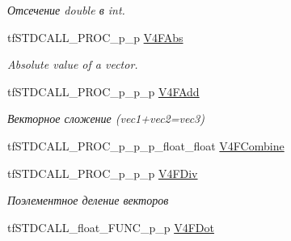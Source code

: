 \begin{DoxyCompactItemize}
\begin{DoxyCompactList}\small\item\em Отсечение double в int. \end{DoxyCompactList}\item 
\hypertarget{structs_functions_vector_c_p_u_a8dc673f10ac0abfe245f7ea4720bdee3}{tf\-S\-T\-D\-C\-A\-L\-L\-\_\-\-P\-R\-O\-C\-\_\-p\-\_\-p \hyperlink{structs_functions_vector_c_p_u_a8dc673f10ac0abfe245f7ea4720bdee3}{V4\-F\-Abs}}\label{structs_functions_vector_c_p_u_a8dc673f10ac0abfe245f7ea4720bdee3}

\begin{DoxyCompactList}\small\item\em Absolute value of a vector. \end{DoxyCompactList}\item 
\hypertarget{structs_functions_vector_c_p_u_a4264664b6173d924beaed5b948ddf71a}{tf\-S\-T\-D\-C\-A\-L\-L\-\_\-\-P\-R\-O\-C\-\_\-p\-\_\-p\-\_\-p \hyperlink{structs_functions_vector_c_p_u_a4264664b6173d924beaed5b948ddf71a}{V4\-F\-Add}}\label{structs_functions_vector_c_p_u_a4264664b6173d924beaed5b948ddf71a}

\begin{DoxyCompactList}\small\item\em Векторное сложение (vec1+vec2=vec3) \end{DoxyCompactList}\item 
tf\-S\-T\-D\-C\-A\-L\-L\-\_\-\-P\-R\-O\-C\-\_\-p\-\_\-p\-\_\-p\-\_\-float\-\_\-float \hyperlink{structs_functions_vector_c_p_u_a7ed43c42342bd62480db26a4e6127277}{V4\-F\-Combine}
\item 
\hypertarget{structs_functions_vector_c_p_u_a09bc99279d2697c0897751a261656719}{tf\-S\-T\-D\-C\-A\-L\-L\-\_\-\-P\-R\-O\-C\-\_\-p\-\_\-p\-\_\-p \hyperlink{structs_functions_vector_c_p_u_a09bc99279d2697c0897751a261656719}{V4\-F\-Div}}\label{structs_functions_vector_c_p_u_a09bc99279d2697c0897751a261656719}

\begin{DoxyCompactList}\small\item\em Поэлементное деление векторов \end{DoxyCompactList}\item 
\hypertarget{structs_functions_vector_c_p_u_a9d7841895cd740a962a8773d12280b8e}{tf\-S\-T\-D\-C\-A\-L\-L\-\_\-float\-\_\-\-F\-U\-N\-C\-\_\-p\-\_\-p \hyperlink{structs_functions_vector_c_p_u_a9d7841895cd740a962a8773d12280b8e}{V4\-F\-Dot}}\label{structs_functions_vector_c_p_u_a9d7841895cd740a962a8773d12280b8e}


\end{DoxyCompactItemize}
